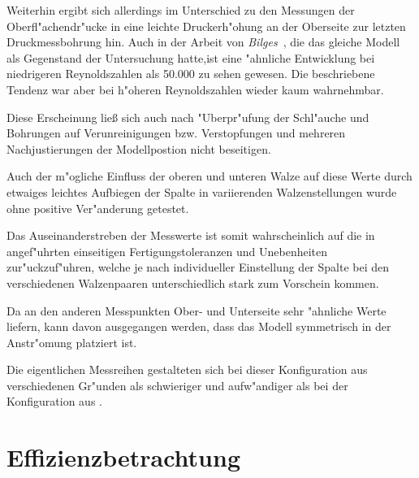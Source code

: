 Weiterhin ergibt sich allerdings im Unterschied zu den Messungen der Oberfl"achendr"ucke in  eine leichte Druckerh"ohung an der Oberseite zur letzten Druckmessbohrung hin.
Auch in der Arbeit von \emph{Bilges} \,\cite{Bilges.2018}, die das gleiche Modell als Gegenstand der Untersuchung hatte,ist eine "ahnliche Entwicklung bei niedrigeren Reynoldszahlen als 50.000 zu sehen gewesen.
Die beschriebene Tendenz war aber bei h"oheren Reynoldszahlen wieder kaum wahrnehmbar.


Diese Erscheinung lie\ss{} sich auch nach "Uberpr"ufung der Schl"auche und Bohrungen auf Verunreinigungen bzw. Verstopfungen und mehreren Nachjustierungen der Modellpostion nicht beseitigen.

Auch der m"ogliche Einfluss der oberen und unteren Walze auf diese Werte durch etwaiges leichtes Aufbiegen der Spalte in variierenden Walzenstellungen wurde ohne positive Ver"anderung getestet.

Das Auseinanderstreben der Messwerte ist somit wahrscheinlich auf die in \cite{Bilges.2018} angef"uhrten einseitigen Fertigungstoleranzen und Unebenheiten zur"uckzuf"uhren, welche je nach individueller Einstellung der Spalte bei den verschiedenen Walzenpaaren unterschiedlich stark zum Vorschein kommen.

Da an den anderen Messpunkten Ober- und Unterseite sehr "ahnliche Werte liefern, kann davon ausgegangen werden, dass das Modell symmetrisch in der Anstr"omung platziert ist.


Die eigentlichen Messreihen gestalteten sich bei dieser Konfiguration aus verschiedenen Gr"unden als schwieriger und aufw"andiger als bei der Konfiguration aus .

%
%
%
\section{Effizienzbetrachtung}
